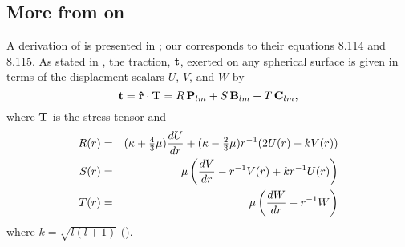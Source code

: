 \documentclass[11pt,titlepage,fleqn]{article}
\begin{document}



\subsection{More from \cite{DT} on }
\label{sec:ODEs}

A derivation of  is presented in \cite{DT}; our  corresponds to their equations 8.114 and 8.115. As stated in \cite[][p.~270]{DT}, the traction, $\mbox{${\bf t}$}$, exerted on any spherical surface is given in terms of the displacment scalars $U$, $V$, and $W$ by
%
\begin{equation}
\mbox{${\bf t}$} = \mbox{\boldmath{$\hat{\rm r}$}} \cdot \mbox{${\bf T}$} = R\,\mbox{${\bf P}$}_{lm} + S\,\mbox{${\bf B}$}_{lm} + T\,\mbox{${\bf C}$}_{lm},
\end{equation}
%
where $\mbox{${\bf T}$}$ is the stress tensor and
%
\begin{eqnarray}
R(r) &=& (\kappa + \sfrac{4}{3}\mu)\frac{d U}{d r} + (\kappa - \sfrac{2}{3}\mu)r^{-1}(2 U(r) - k V(r))
\\
S(r) &=& \mu \left( \frac{d V}{d r} - r^{-1} V(r) + kr^{-1}U(r) \right)
\\
T(r) &=& \mu \left( \frac{d W}{d r} - r^{-1} W \right)
\end{eqnarray}
%
where $k = \sqrt{l(l+1)}$ ().
\end{document}
